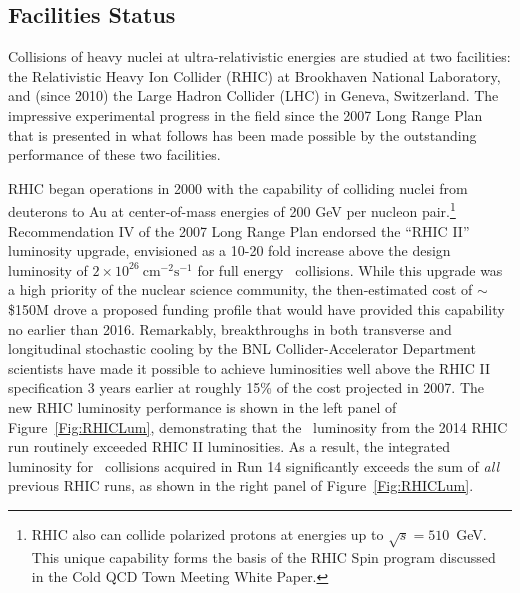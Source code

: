\subsection{Facilities Status}
\label{Sec:Facilities}
Collisions of heavy nuclei at ultra-relativistic energies are studied at two facilities: the Relativistic Heavy Ion Collider (RHIC) at Brookhaven National Laboratory, and (since 2010) the Large Hadron Collider (LHC) in Geneva, Switzerland. The impressive experimental progress in the field since the 2007 Long Range Plan that is presented in what follows has been made possible by the outstanding performance of these two facilities. 

RHIC began operations in 2000 with the capability of colliding nuclei from deuterons to Au at center-of-mass energies of 
200 GeV per nucleon pair.\footnote{RHIC also can collide  polarized protons at energies up to $\sqrt{s}=510$~GeV. This unique capability forms the basis of the RHIC Spin program\cite{Aschenauer:2015eha} discussed in the Cold QCD Town Meeting White Paper.}
Recommendation IV of the 2007 Long Range Plan endorsed the ``RHIC II'' luminosity upgrade, envisioned as a 10-20 fold increase above the design luminosity of $2 \times 10^{26}\ \mathrm{cm^{-2} s^{-1}}$ for full energy \AuAu\ collisions. 
While this upgrade was a high priority of the nuclear science community, the then-estimated cost of $\sim$\$150M drove a proposed funding profile that would have provided this capability no earlier than 2016. Remarkably, breakthroughs in both transverse and longitudinal stochastic cooling by the BNL Collider-Accelerator Department scientists have made it possible to achieve luminosities well above the RHIC II specification 3 years earlier at roughly 15\% of the cost projected in 2007. The new RHIC luminosity performance is shown in the left panel of Figure~\ref{Fig:RHICLum},
demonstrating that the \AuAu\ luminosity from the 2014 RHIC run routinely exceeded RHIC II luminosities. As a result, the integrated luminosity for \AuAu\ collisions acquired in Run 14 significantly exceeds the sum of {\em all} previous RHIC runs\cite{RHICPerformance}, as shown in the right panel of Figure~\ref{Fig:RHICLum}.
